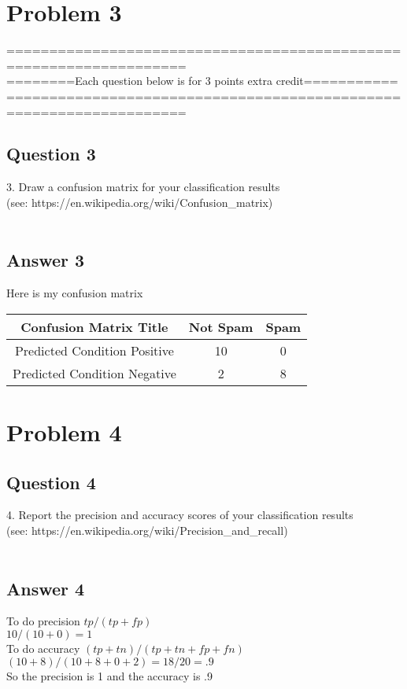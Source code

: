 \documentclass[10pt,letterpaper]{article}
\begin{document}
\section{Problem 3}
===================================================================\\
========Each question below is for 3 points extra credit===========\\
===================================================================\\

\subsection{Question 3}
3. Draw a confusion matrix for your classification results\\
(see: https://en.wikipedia.org/wiki/Confusion\_matrix)\\
\\
\subsection{Answer 3}
Here is my confusion matrix
\begin{center}
  \begin{tabular}{ | c | c | c}
    \hline
     Confusion Matrix Title & Not Spam & Spam\\ \hline
     Predicted Condition Positive & 10 & 0\\ \hline
     Predicted Condition Negative & 2 & 8\\ \hline 
     \hline
  \end{tabular}
\end{center}


\pagebreak
\section{Problem 4}
\subsection{Question 4}
4. Report the precision and accuracy scores of your classification results\\
(see: https://en.wikipedia.org/wiki/Precision\_and\_recall)\\
\\
\subsection{Answer 4}

To do precision $tp / (tp + fp)$
\\
$10 / (10 + 0) = 1$
\\
To do accuracy $(tp + tn) / (tp + tn + fp +fn)$
\\
$(10 + 8) / (10 + 8 + 0 + 2) = 18 / 20 = .9$
\\
So the precision is 1 and the accuracy is .9\\

\pagebreak
\end{document}
